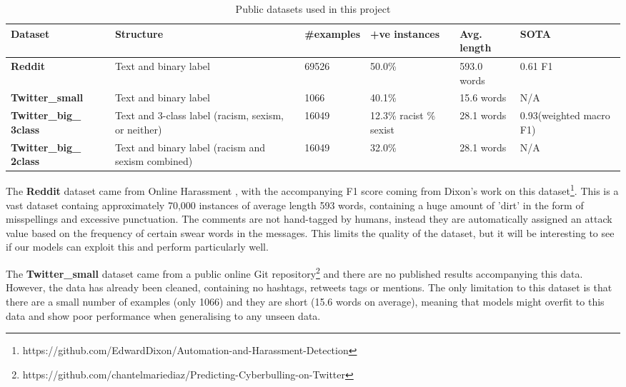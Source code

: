 \documentclass[12pt,a4paper]{article}
\begin{document}
\begin{table}[htb]
	\centering
	\caption{Public datasets used in this project}
	\label{data}
	\hspace*{-2.2cm}
	\begin{tabular}{p{3.4cm} p{5.2cm} p{2cm} p{2.5cm} p{2.2cm} p{2.2cm}} \hline\hline
		\textbf{Dataset} & \textbf{Structure} & \textbf{\#examples} & \textbf{+ve instances} & \textbf{Avg. length} & \textbf{SOTA} \\ \hline
		\textbf{Reddit} & Text and binary label & 69526 & 50.0\% & 593.0 words & 0.61 F1\\ \hline
		\textbf{Twitter\_small} & Text and binary label & 1066 & 40.1\% & 15.6 words & N/A \\ \hline
		\textbf{Twitter\_big\_ 3class} & Text and 3-class label \newline (racism, sexism, or neither) & 16049 & 12.3\% racist \newline 19.7\% sexist & 28.1 words & 0.93\newline (weighted macro F1) \\ \hline
		\textbf{Twitter\_big\_ 2class} & Text and binary label \newline (racism and sexism combined) & 16049 & 32.0\% & 28.1 words & N/A \\ \hline
	\end{tabular}
\end{table}

The \textbf{Reddit} dataset came from Online Harassment \cite{Golbeck}, with the accompanying F1 score coming from Dixon's work \citeyear{Dixon} on this dataset\footnote{https://github.com/EdwardDixon/Automation-and-Harassment-Detection}. This is a vast dataset containg approximately 70,000 instances of average length 593 words, containing a huge amount of 'dirt' in the form of misspellings and excessive punctuation. The comments are not hand-tagged by humans, instead they are automatically assigned an attack value based on the frequency of certain swear words in the messages. This limits the quality of the dataset, but it will be interesting to see if our models can exploit this and perform particularly well.

The \textbf{Twitter\_small} dataset came from a public online Git repository\footnote{https://github.com/chantelmariediaz/Predicting-Cyberbulling-on-Twitter} and there are no published results accompanying this data. However, the data has already been cleaned, containing no hashtags, retweets tags or mentions. The only limitation to this dataset is that there are a small number of examples (only 1066) and they are short (15.6 words on average), meaning that models might overfit to this data and show poor performance when generalising to any unseen data.
\end{document}

